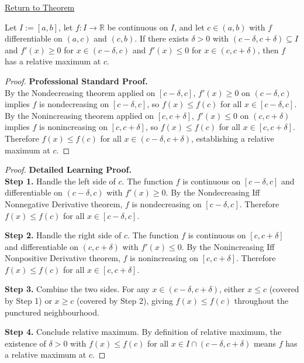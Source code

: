 \newpage
{}
\label{prf:first-derivative-test-maximum}

\begin{remark*}[Return]
\hyperref[thm:first-derivative-test-maximum]{Return to Theorem}
\end{remark*}

\begin{theorem*}
Let $I := [a,b]$, let $f : I \to \mathbb{R}$ be continuous on $I$, and let $c \in (a,b)$ with $f$ differentiable on $(a,c)$ and $(c,b)$. If there exists $\delta > 0$ with $(c-\delta,c+\delta) \subseteq I$ and $f'(x) \geq 0$ for $x \in (c-\delta,c)$ and $f'(x) \leq 0$ for $x \in (c,c+\delta)$, then $f$ has a relative maximum at $c$.
\end{theorem*}

\begin{proof}
\textbf{Professional Standard Proof.}~\\
By the Nondecreasing theorem applied on $[c-\delta, c]$, $f'(x) \geq 0$ on $(c-\delta,c)$ implies $f$ is nondecreasing on $[c-\delta,c]$, so $f(x) \leq f(c)$ for all $x \in [c-\delta,c]$. By the Nonincreasing theorem applied on $[c,c+\delta]$, $f'(x) \leq 0$ on $(c,c+\delta)$ implies $f$ is nonincreasing on $[c,c+\delta]$, so $f(x) \leq f(c)$ for all $x \in [c,c+\delta]$. Therefore $f(x) \leq f(c)$ for all $x \in (c-\delta,c+\delta)$, establishing a relative maximum at $c$.
\end{proof}

\begin{proof}
\textbf{Detailed Learning Proof.}~\\

\textbf{Step 1.} Handle the left side of $c$. The function $f$ is continuous on $[c-\delta,c]$ and differentiable on $(c-\delta,c)$ with $f'(x) \geq 0$. By the Nondecreasing Iff Nonneg\-ative Derivative theorem, $f$ is nondecreasing on $[c-\delta,c]$. Therefore $f(x) \leq f(c)$ for all $x \in [c-\delta,c]$.

\textbf{Step 2.} Handle the right side of $c$. The function $f$ is continuous on $[c,c+\delta]$ and differentiable on $(c,c+\delta)$ with $f'(x) \leq 0$. By the Nonincreasing Iff Nonpos\-itive Derivative theorem, $f$ is nonincreasing on $[c,c+\delta]$. Therefore $f(x) \leq f(c)$ for all $x \in [c,c+\delta]$.

\textbf{Step 3.} Combine the two sides. For any $x \in (c-\delta,c+\delta)$, either $x \leq c$ (covered by Step 1) or $x \geq c$ (covered by Step 2), giving $f(x) \leq f(c)$ throughout the punctured neighbourhood.

\textbf{Step 4.} Conclude relative maximum. By definition of relative maximum, the existence of $\delta > 0$ with $f(x) \leq f(c)$ for all $x \in I \cap (c-\delta,c+\delta)$ means $f$ has a relative maximum at $c$.
\end{proof}

